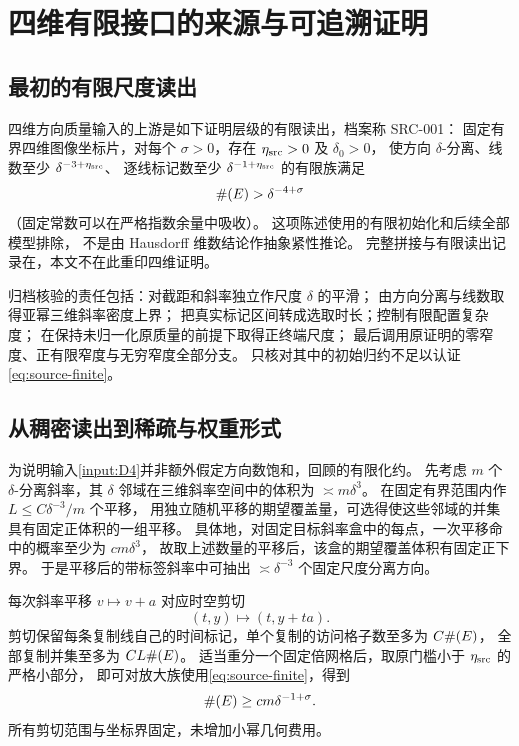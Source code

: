 \section{四维有限接口的来源与可追溯证明}\label{app:inputs}

\subsection{最初的有限尺度读出}
四维方向质量输入的上游是如下证明层级的有限读出，档案称 SRC-001：
固定有界四维图像坐标片，对每个 $\sigma>0$，存在 $\eta_{\rm src}>0$ 及 $\delta_0>0$，
使方向 $\delta$-分离、线数至少 $\delta^{-3+\eta_{\rm src}}$、
逐线标记数至少 $\delta^{-1+\eta_{\rm src}}$ 的有限族满足
\begin{equation}\label{eq:source-finite}
 \#\!\left(E\right)>\delta^{-4+\sigma}
\end{equation}
（固定常数可以在严格指数余量中吸收）。
这项陈述使用\cite{OAI4}的有限初始化和后续全部模型排除，
不是由 Hausdorff 维数结论作抽象紧性推论。
完整拼接与有限读出记录在\cite{ArchiveSource}，本文不在此重印四维证明。

归档核验的责任包括：对截距和斜率独立作尺度 $\delta$ 的平滑；
由方向分离与线数取得亚幂三维斜率密度上界；
把真实标记区间转成选取时长；控制有限配置复杂度；
在保持未归一化原质量的前提下取得正终端尺度；
最后调用原证明的零窄度、正有限窄度与无穷窄度全部分支。
只核对其中的初始归约不足以认证\eqref{eq:source-finite}。

\subsection{从稠密读出到稀疏与权重形式}
为说明输入\ref{input:D4}并非额外假定方向数饱和，回顾\cite{ArchiveDIR}的有限化约。
先考虑 $m$ 个 $\delta$-分离斜率，其 $\delta$ 邻域在三维斜率空间中的体积为
$\asymp m\delta^3$。
在固定有界范围内作 $L\le C\delta^{-3}/m$ 个平移，
用独立随机平移的期望覆盖量，可选得使这些邻域的并集具有固定正体积的一组平移。
具体地，对固定目标斜率盒中的每点，一次平移命中的概率至少为 $c m\delta^3$，
故取上述数量的平移后，该盒的期望覆盖体积有固定正下界。
于是平移后的带标签斜率中可抽出 $\asymp\delta^{-3}$ 个固定尺度分离方向。

每次斜率平移 $v\mapsto v+a$ 对应时空剪切
\[
 (t,y)\mapsto(t,y+ta).
\]
剪切保留每条复制线自己的时间标记，单个复制的访问格子数至多为 $C\#\!\left(E\right)$，
全部复制并集至多为 $CL\#\!\left(E\right)$。
适当重分一个固定倍网格后，取原门槛小于 $\eta_{\rm src}$ 的严格小部分，
即可对放大族使用\eqref{eq:source-finite}，得到
\begin{equation}\label{eq:sparse-source}
 \#\!\left(E\right)\ge c m\delta^{-1+\sigma}.
\end{equation}
所有剪切范围与坐标界固定，未增加小幂几何费用。

